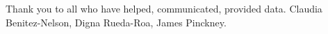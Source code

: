 \documentclass[draft]{agujournal2019}
\begin{document}
\acknowledgments
Thank you to all who have helped, communicated, provided data. Claudia Benitez-Nelson, Digna Rueda-Roa, James Pinckney.



%
%





%
%
%
%
%
\end{document}
